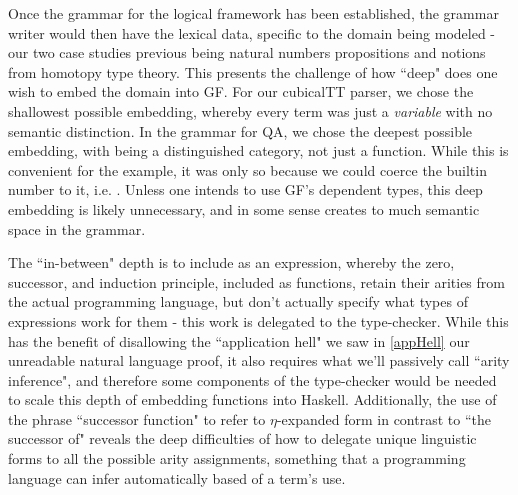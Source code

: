 Once the grammar for the logical framework has been established, the grammar
writer would then have the lexical data, specific to the domain being modeled -
our two case studies previous being natural numbers propositions and
notions from homotopy type theory.  This presents the challenge of how ``deep"
does one wish to embed the domain into GF. For our cubicalTT parser, we chose
the shallowest possible embedding, whereby every term was just a \emph{variable}
with no semantic distinction. In the grammar for QA, we chose the deepest
possible embedding, with  being a distinguished category, not just
a function. While this is convenient for the example, it was only so because
we could coerce the builtin number to it, i.e. . Unless one
intends to use GF's dependent types, this deep embedding is likely unnecessary,
and in some sense creates to much semantic space in the grammar.

The ``in-between" depth is to include  as an expression, whereby the
zero, successor, and induction principle, included as functions, retain their
arities from the actual programming language, but don't actually specify what
types of expressions work for them - this work is delegated to the type-checker.
While this has the benefit of disallowing the ``application hell" we saw in
\ref{appHell} our
unreadable natural language proof, it also requires what we'll passively call
``arity inference", and therefore some components of the type-checker would be
needed to scale this depth of embedding functions into Haskell. Additionally,
the use of the phrase ``successor function" to refer to $\eta$-expanded form in
contrast to ``the successor of" reveals the deep difficulties of how to delegate
unique linguistic forms to all the possible arity assignments, something that a
programming language can infer automatically based of a term's use.

